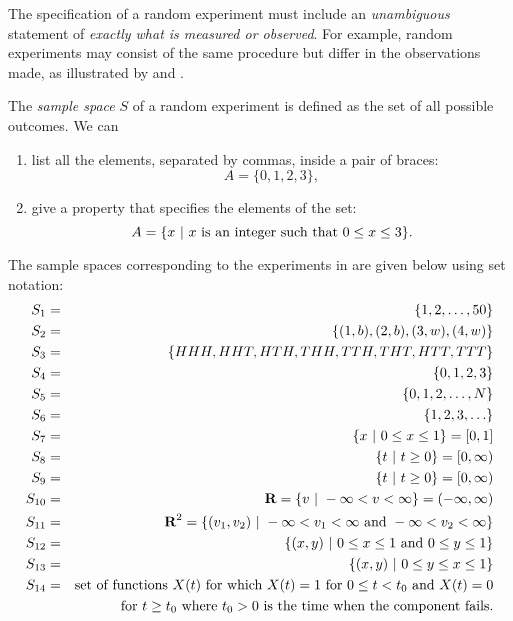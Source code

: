 	\item The specification of a random experiment must include an \emph{unambiguous} statement of \emph{exactly what is measured or observed}. For example, random experiments may consist of the same procedure but differ in the observations made, as illustrated by  and .

	\item The \emph{sample space} $S$ of a random experiment is defined as the set of all possible outcomes.  We can
	\begin{enumerate}
		\item list all the elements, separated by commas, inside a pair of braces:
		\[ A = \{0,1,2,3\},\]
		\item give a property that specifies the elements of the set:
		\[ A = \{x~|~x \mbox{ is an integer such that } 0\leq x\leq 3\}.\]
	\end{enumerate}

	\item The sample spaces corresponding to the experiments in  are given below using set notation:
	\begin{eqnarray*}
		S_1 &=& \{ 1,2,\ldots, 50\}
		\\S_2 &=& \{(1,b),(2,b),(3,w),(4,w)\}
		\\S_3 &=& \{HHH, HHT, HTH, THH, TTH, THT, HTT, TTT\}
		\\S_4 &=& \{0,1,2,3\}
		\\S_5 &=& \{0,1,2,\ldots,N\}
		\\S_6 &=& \{1,2,3,\ldots\}
		\\S_7 &=& \{x~|~0\leq x\leq 1\} = [0,1]
		\\S_8 &=& \{t~|~t\geq 0\} = [0,\infty)
		\\S_9 &=& \{t~|~t\geq 0\} = [0,\infty)
		\\S_{10} &=& {\mbox{\bf R}} = \{v~|~-\infty < v < \infty \} = (-\infty,\infty)
		\\S_{11} &=& {\mbox{\bf R}}^2 = \{(v_1,v_2)~|~ -\infty < v_1 < \infty \mbox{ and } -\infty < v_2 < \infty \}
		\\S_{12} &=& \{(x,y)~|~0\leq x\leq 1 \mbox{ and } 0\leq y\leq 1\}
		\\S_{13} &=& \{(x,y)~|~0\leq y\leq x\leq 1\}
		\\S_{14} &=& \mbox{set of functions $X(t)$ for which }
			X(t) = 1 \mbox{ for } 0\leq t < t_0
			\mbox{ and } X(t) = 0
		\\&& \mbox{ for } t\geq t_0
		\mbox{ where } t_0 > 0 \mbox{ is the time when the component fails.}
	\end{eqnarray*}

